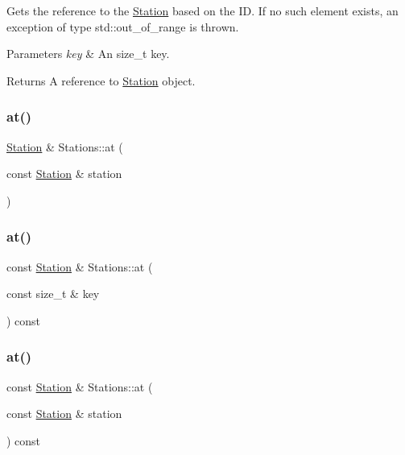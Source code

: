 Gets the reference to the \mbox{\hyperlink{class_station}{Station}} based on the ID. If no such element exists, an exception of type std\+::out\+\_\+of\+\_\+range is thrown.


\begin{DoxyParams}{Parameters}
{\em key} & An size\+\_\+t key. \\
\hline
\end{DoxyParams}
\begin{DoxyReturn}{Returns}
A reference to \mbox{\hyperlink{class_station}{Station}} object. 
\end{DoxyReturn}
\mbox{\label{class_stations_a0db00fc62fdeebde93f2624477074087}} 
\subsubsection{\texorpdfstring{at()}{at()}\hspace{0.1cm}{\footnotesize\ttfamily [2/4]}}
{\footnotesize\ttfamily \mbox{\hyperlink{class_station}{Station}} \& Stations\+::at (\begin{DoxyParamCaption}\item[{const \mbox{\hyperlink{class_station}{Station}} \&}]{station }\end{DoxyParamCaption})}

\mbox{\label{class_stations_ab785e4995153a682ac3fd739b99e8db3}} 
\subsubsection{\texorpdfstring{at()}{at()}\hspace{0.1cm}{\footnotesize\ttfamily [3/4]}}
{\footnotesize\ttfamily const \mbox{\hyperlink{class_station}{Station}} \& Stations\+::at (\begin{DoxyParamCaption}\item[{const size\+\_\+t \&}]{key }\end{DoxyParamCaption}) const}

\mbox{\label{class_stations_a76175b88bafb7de42fae0a5d7518aac9}} 
\subsubsection{\texorpdfstring{at()}{at()}\hspace{0.1cm}{\footnotesize\ttfamily [4/4]}}
{\footnotesize\ttfamily const \mbox{\hyperlink{class_station}{Station}} \& Stations\+::at (\begin{DoxyParamCaption}\item[{const \mbox{\hyperlink{class_station}{Station}} \&}]{station }\end{DoxyParamCaption}) const}

